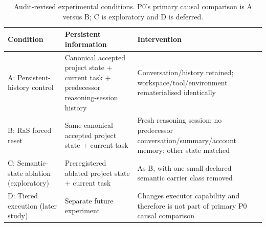\begin{table}[htbp]
\centering
\small
\caption{Audit-revised experimental conditions. P0's primary causal comparison is A versus B; C is exploratory and D is deferred.}
\label{tab:conditions}
\begin{tabularx}{\textwidth}{@{}lX X@{}}
\toprule
Condition & Persistent information & Intervention \\
\midrule
A: Persistent-history control & Canonical accepted project state + current task + predecessor reasoning-session history & Conversation/history retained; workspace/tool/environment rematerialised identically \\
B: RaS forced reset & Same canonical accepted project state + current task & Fresh reasoning session; no predecessor conversation/summary/account memory; other state matched \\
C: Semantic-state ablation (exploratory) & Preregistered ablated project state + current task & As B, with one small declared semantic carrier class removed \\
D: Tiered execution (later study) & Separate future experiment & Changes executor capability and therefore is not part of primary P0 causal comparison \\
\bottomrule
\end{tabularx}
\end{table}
